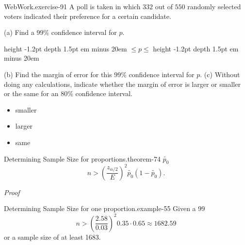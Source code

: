 \documentclass[10pt,]{book}
\makeatletter
\newcommand{\fillin}[1]{\leavevmode\leaders\vrule height -1.2pt depth 1.5pt \hskip #1em minus #1em \null}
\renewcommand*{\proofname}{Proof}
\renewenvironment{proof}[1][\proofname]{\par
  \pushQED{\qed}%
  \normalfont \topsep6\p@\@plus6\p@\relax
  \trivlist
  \item\relax
    {\itshape
    #1\@addpunct{.}}\hspace\labelsep\ignorespaces
}{%
  \popQED\endtrivlist\@endpefalse
}
\numberwithin{equation}{section}
\newcommand{\gt}{>}
\makeatother
\begin{document}
%
\par
\hypertarget{p-1358}{}%
\begin{inlineexercise}{WebWork.}{exercise-91}%
\hypertarget{p-1359}{}%
A poll is taken in which \(332\) out of \(550\) randomly selected voters indicated their preference for a certain candidate.%
\par
\hypertarget{p-1360}{}%
(a) Find a \(99\)\% confidence interval for \(p\).%
\par
\hypertarget{p-1361}{}%
 \fillin{20} \(\leq p \leq\)  \fillin{20}%
\par
\hypertarget{p-1362}{}%
(b) Find the margin of error for this \(99\)\% confidence interval for \(p\).%
\hypertarget{p-1364}{}%
(c) Without doing any calculations, indicate whether the margin of error is larger or smaller or the same for an 80\% confidence interval. \par
\begin{itemize}[label=$\odot$,leftmargin=3em,]
\item{}\hypertarget{p-1365}{}%
smaller%

\item{}\hypertarget{p-1366}{}%
larger%

\item{}\hypertarget{p-1367}{}%
same%

\end{itemize}
%
\end{inlineexercise}
%
\begin{theorem}{Determining Sample Size for proportions.}{}{theorem-74}%
\(\tilde{p_0}\)%
\begin{equation*}
n \gt \left ( \frac{z_{\alpha /2}}{E} \right )^2 \tilde{p_0}(1-\tilde{p_0}).
\end{equation*}
\end{theorem}
\begin{proof}\hypertarget{proof-74}{}
\end{proof}
\begin{example}{Determining Sample Size for one proportion.}{example-55}%
\hypertarget{p-1368}{}%
Given a 99%
\begin{equation*}
n \gt \left ( \frac{2.58}{0.03} \right )^2 0.35 \cdot 0.65 \approx 1682.59
\end{equation*}
or a sample size of at least 1683.%
\end{example}
\hypertarget{p-1369}{}%
\end{document}
